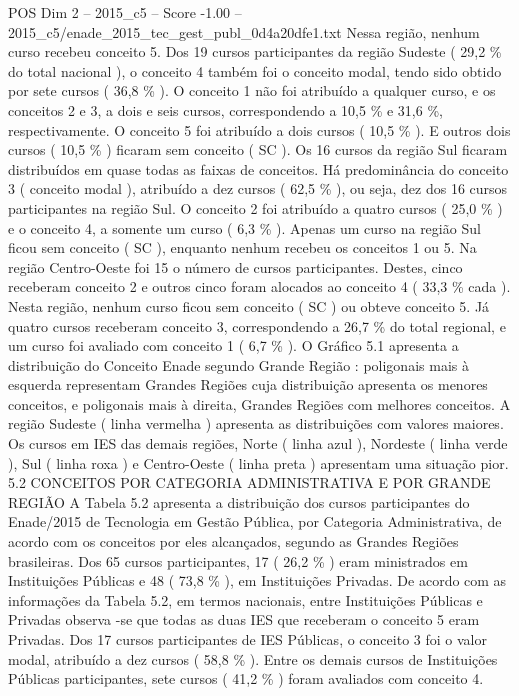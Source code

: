 \begin{textsample}{POS Dim 2 – 2015\_c5 – Score -1.00 – 2015\_c5/enade\_2015\_tec\_gest\_publ\_0d4a20dfe1.txt}
Nessa região, nenhum curso recebeu conceito 5.
Dos 19 cursos participantes da região Sudeste ( 29,2 \% do total nacional ), o conceito 4 também foi o conceito modal, tendo sido obtido por sete cursos ( 36,8 \% ).
O conceito 1 não foi atribuído a qualquer curso, e os conceitos 2 e 3, a dois e seis cursos, correspondendo a 10,5 \% e 31,6 \%, respectivamente.
O conceito 5 foi atribuído a dois cursos ( 10,5 \% ).
E outros dois cursos ( 10,5 \% ) ficaram sem conceito ( SC ).
Os 16 cursos da região Sul ficaram distribuídos em quase todas as faixas de conceitos.
Há predominância do conceito 3 ( conceito modal ), atribuído a dez cursos ( 62,5 \% ), ou seja, dez dos 16 cursos participantes na região Sul.
O conceito 2 foi atribuído a quatro cursos ( 25,0 \% ) e o conceito 4, a somente um curso ( 6,3 \% ).
Apenas um curso na região Sul ficou sem conceito ( SC ), enquanto nenhum recebeu os conceitos 1 ou 5.
Na região Centro-Oeste foi 15 o número de cursos participantes.
Destes, cinco receberam conceito 2 e outros cinco foram alocados ao conceito 4 ( 33,3 \% cada ).
Nesta região, nenhum curso ficou sem conceito ( SC ) ou obteve conceito 5.
Já quatro cursos receberam conceito 3, correspondendo a 26,7 \% do total regional, e um curso foi avaliado com conceito 1 ( 6,7 \% ).
O Gráfico 5.1 apresenta a distribuição do Conceito Enade segundo Grande Região : poligonais mais à esquerda representam Grandes Regiões cuja distribuição apresenta os menores conceitos, e poligonais mais à direita, Grandes Regiões com melhores conceitos.
A região Sudeste ( linha vermelha ) apresenta as distribuições com valores maiores.
Os cursos em IES das demais regiões, Norte ( linha azul ), Nordeste ( linha verde ), Sul ( linha roxa ) e Centro-Oeste ( linha preta ) apresentam uma situação pior. 5.2 CONCEITOS POR CATEGORIA ADMINISTRATIVA E POR GRANDE REGIÃO A Tabela 5.2 apresenta a distribuição dos cursos participantes do Enade/2015 de Tecnologia em Gestão Pública, por Categoria Administrativa, de acordo com os conceitos por eles alcançados, segundo as Grandes Regiões brasileiras.
Dos 65 cursos participantes, 17 ( 26,2 \% ) eram ministrados em Instituições Públicas e 48 ( 73,8 \% ), em Instituições Privadas.
De acordo com as informações da Tabela 5.2, em termos nacionais, entre Instituições Públicas e Privadas observa -se que todas as duas IES que receberam o conceito 5 eram Privadas.
Dos 17 cursos participantes de IES Públicas, o conceito 3 foi o valor modal, atribuído a dez cursos ( 58,8 \% ).
Entre os demais cursos de Instituições Públicas participantes, sete cursos ( 41,2 \% ) foram avaliados com conceito 4.

\end{textsample}
